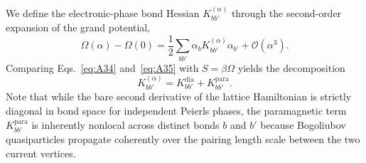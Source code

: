 \documentclass[aps,prb,twocolumn,superscriptaddress,floatfix]{revtex4-2}
\begin{document}
We define the electronic-phase bond Hessian $K_{bb'}^{(\alpha)}$ through the second-order expansion of the grand potential,
\begin{equation}
\Omega(\alpha) - \Omega(0) = \frac{1}{2}\sum_{bb'} \alpha_b K_{bb'}^{(\alpha)} \alpha_{b'} + \mathcal{O}(\alpha^3).
\label{eq:A40}
\end{equation}
Comparing Eqs.~\eqref{eq:A34} and~\eqref{eq:A35} with $S = \beta\Omega$ yields the decomposition
\begin{equation}
K_{bb'}^{(\alpha)} = K_{bb'}^{\mathrm{dia}} + K_{bb'}^{\mathrm{para}}.
\label{eq:A41}
\end{equation}
Note that while the bare second derivative of the lattice Hamiltonian is strictly diagonal in bond space for independent Peierls phases, the paramagnetic term $K_{bb'}^{\mathrm{para}}$ is inherently nonlocal across distinct bonds $b$ and $b'$ because Bogoliubov quasiparticles propagate coherently over the pairing length scale between the two current vertices.
\end{document}

